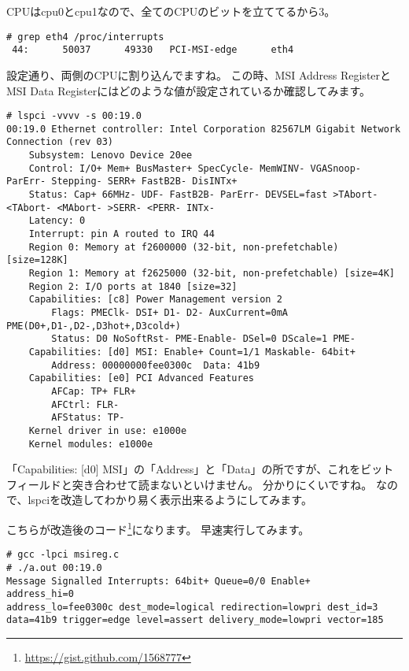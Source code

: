 CPUはcpu0とcpu1なので、全てのCPUのビットを立ててるから3。

\begin{program}[H]\centering
\begin{verbatim}
# grep eth4 /proc/interrupts 
 44:      50037      49330   PCI-MSI-edge      eth4
\end{verbatim}
\end{program}

設定通り、両側のCPUに割り込んでますね。
この時、MSI Address RegisterとMSI Data Registerにはどのような値が設定されているか確認してみます。

\begin{program}[H]\centering
\begin{verbatim}
# lspci -vvvv -s 00:19.0
00:19.0 Ethernet controller: Intel Corporation 82567LM Gigabit Network Connection (rev 03)
	Subsystem: Lenovo Device 20ee
	Control: I/O+ Mem+ BusMaster+ SpecCycle- MemWINV- VGASnoop- ParErr- Stepping- SERR+ FastB2B- DisINTx+
	Status: Cap+ 66MHz- UDF- FastB2B- ParErr- DEVSEL=fast >TAbort- <TAbort- <MAbort- >SERR- <PERR- INTx-
	Latency: 0
	Interrupt: pin A routed to IRQ 44
	Region 0: Memory at f2600000 (32-bit, non-prefetchable) [size=128K]
	Region 1: Memory at f2625000 (32-bit, non-prefetchable) [size=4K]
	Region 2: I/O ports at 1840 [size=32]
	Capabilities: [c8] Power Management version 2
		Flags: PMEClk- DSI+ D1- D2- AuxCurrent=0mA PME(D0+,D1-,D2-,D3hot+,D3cold+)
		Status: D0 NoSoftRst- PME-Enable- DSel=0 DScale=1 PME-
	Capabilities: [d0] MSI: Enable+ Count=1/1 Maskable- 64bit+
		Address: 00000000fee0300c  Data: 41b9
	Capabilities: [e0] PCI Advanced Features
		AFCap: TP+ FLR+
		AFCtrl: FLR-
		AFStatus: TP-
	Kernel driver in use: e1000e
	Kernel modules: e1000e
\end{verbatim}
\end{program}
「Capabilities: [d0] MSI」の「Address」と「Data」の所ですが、これをビットフィールドと突き合わせて読まないといけません。
分かりにくいですね。
なので、lspciを改造してわかり易く表示出来るようにしてみます。

こちらが改造後のコード\footnote{\url{https://gist.github.com/1568777}}になります。
早速実行してみます。
\begin{program}[H]\centering
\begin{verbatim}
# gcc -lpci msireg.c
# ./a.out 00:19.0
Message Signalled Interrupts: 64bit+ Queue=0/0 Enable+
address_hi=0
address_lo=fee0300c dest_mode=logical redirection=lowpri dest_id=3
data=41b9 trigger=edge level=assert delivery_mode=lowpri vector=185
\end{verbatim}
\end{program}

